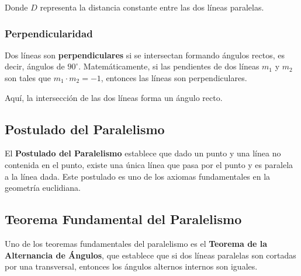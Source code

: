 
Donde \( D \) representa la distancia constante entre las dos líneas paralelas.

\subsubsection{Perpendicularidad}

Dos líneas son \textbf{perpendiculares} si se intersectan formando ángulos rectos, es decir, ángulos de \( 90^\circ \). Matemáticamente, si las pendientes de dos líneas \( m_1 \) y \( m_2 \) son tales que \( m_1 \cdot m_2 = -1 \), entonces las líneas son perpendiculares.


Aquí, la intersección de las dos líneas forma un ángulo recto.

\subsection{Postulado del Paralelismo}

El \textbf{Postulado del Paralelismo} establece que dado un punto y una línea no contenida en el punto, existe una única línea que pasa por el punto y es paralela a la línea dada. Este postulado es uno de los axiomas fundamentales en la geometría euclidiana.

\subsection{Teorema Fundamental del Paralelismo}

Uno de los teoremas fundamentales del paralelismo es el \textbf{Teorema de la Alternancia de Ángulos}, que establece que si dos líneas paralelas son cortadas por una transversal, entonces los ángulos alternos internos son iguales.

